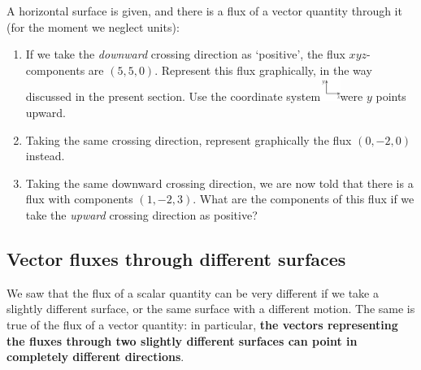 \documentclass[a4paper,12pt,%
onecolumn,oneside,%
british%
]{memoir}
\renewcommand*{\|}[1][]{\nonscript\:#1\vert\nonscript\:\mathopen{}}
\begin{document}
\begin{exercise}
  A horizontal surface is given, and there is a flux of a vector quantity through it (for the moment we neglect units):
  \begin{enumerate}[label=\arabic*.]
  \item If we take the \emph{downward} crossing direction as \enquote*{positive}, the flux $xyz$-components are $(5,5,0)$. Represent this flux graphically, in the way discussed in the present section. Use the coordinate system\enspace\includegraphics[align=c,height=2em]{images/coords_xy.pdf}\enspace were $y$ points upward.
  \item Taking the same crossing direction, represent graphically the flux $(0,-2,0)$ instead.
  \item Taking the same downward crossing direction, we are now told that there is a flux with components $(1,-2,3)$. What are the components of this flux if we take the \emph{upward} crossing direction as positive?
  \end{enumerate}
\end{exercise}


\medskip

\subsection{Vector fluxes through different surfaces}
\label{sec:surface_change_vector}

We saw that the flux of a scalar quantity can be very different if we take a slightly different surface, or the same surface with a different motion. The same is true of the flux of a vector quantity: in particular, \textbf{the vectors representing the fluxes through two slightly different surfaces can point in completely different directions}.
\end{document}
